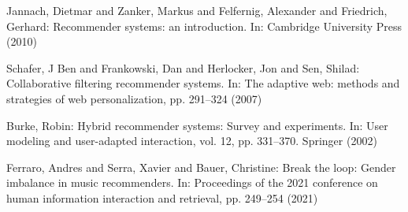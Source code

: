 \documentclass[runningheads,a4paper]{llncs}
\begin{document}
\begin{thebibliography}{4}
 Jannach, Dietmar and Zanker, Markus and Felfernig, Alexander and Friedrich, Gerhard: 
Recommender systems: an introduction. In: Cambridge University Press (2010)

 Schafer, J Ben and Frankowski, Dan and Herlocker, Jon and Sen, Shilad:
Collaborative filtering recommender systems. In: The adaptive web: methods and strategies of web personalization,
pp. 291--324 (2007)

 Burke, Robin: Hybrid recommender systems: Survey and experiments. In:
User modeling and user-adapted interaction, vol. 12, pp. 331--370. Springer (2002)

 Ferraro, Andres and Serra, Xavier and Bauer, Christine:
Break the loop: Gender imbalance in music recommenders. In:
Proceedings of the 2021 conference on human information interaction and retrieval,
pp. 249--254 (2021)







\end{thebibliography}
\end{document}
